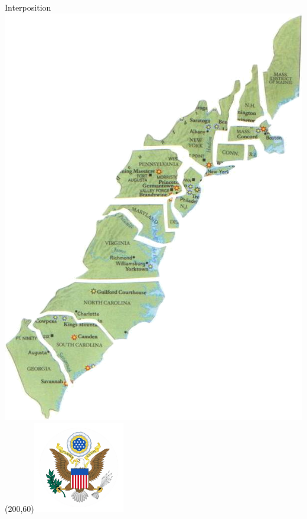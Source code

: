 \begin{frame}{Interposition}
    \includegraphics[height=0.75\textheight]{img/colonies.png} \\
    \Put(200,60){\includegraphics[width=0.3\textwidth]{img/national-seal.png}}

\end{frame}
